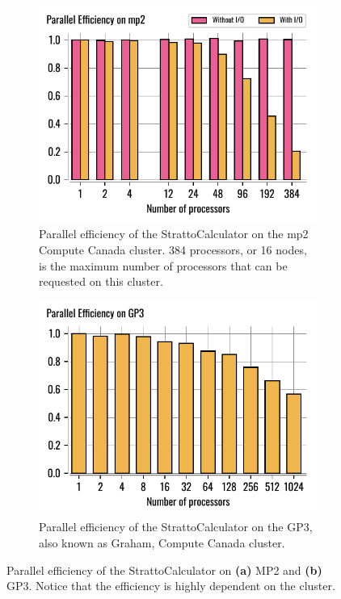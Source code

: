 \documentclass[11pt,SymmetricalJury]{inrsthesis/inrsthesis}
\begin{document}
\begin{figure}
  \centering
  \begin{subfigure}[t]{0.47\textwidth}
    \includegraphics[width=\textwidth]{figs/ParallelEfficiency-mp2.pdf}
    \caption{Parallel efficiency of the StrattoCalculator on the mp2 Compute
             Canada cluster. 384 processors, or 16 nodes, is the maximum number
             of processors that can be requested on this cluster.}
    \label{fig:sc.parallel-efficiency.mp2}
  \end{subfigure}
  \hfill
  \begin{subfigure}[t]{0.47\textwidth}
    \includegraphics[width=\textwidth]{figs/ParallelEfficiency-gp3.pdf}
    \caption{Parallel efficiency of the StrattoCalculator on the GP3, also known
             as Graham, Compute Canada cluster.}
    \label{fig:sc.parallel-efficiency.gp3}
  \end{subfigure}
  \caption[Parallel efficiency of the StrattoCalculator on different clusters.]
          {Parallel efficiency of the StrattoCalculator on \textbf{(a)} MP2
          and \textbf{(b)} GP3. Notice that the efficiency is highly dependent on the cluster.}
  \label{fig:sc.parallel-efficiency}
\end{figure}
\end{document}
